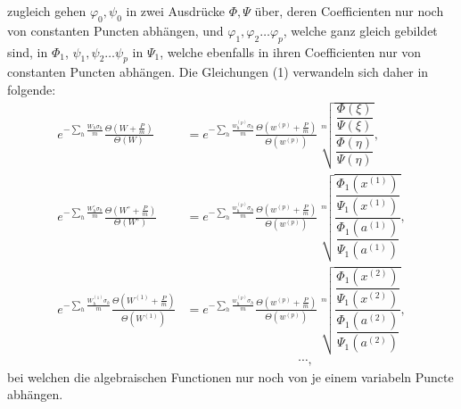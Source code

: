 \documentclass[10pt]{article}
\begin{document}
zugleich gehen \(\varphi_0,\psi_0\) in zwei Ausdrücke \(\Phi,\Psi\) über, deren Coefficienten nur noch von constanten Puncten abhängen, und \(\varphi_1,\varphi_2\ldots\varphi_p\), welche ganz gleich gebildet sind, in \(\Phi_1\), \(\psi_1,\psi_2\ldots\psi_p\) in \(\Psi_1\), welche ebenfalls in ihren Coefficienten nur von constanten Puncten abhängen. Die Gleichungen (1) verwandeln sich daher in folgende:
\[
\begin{aligned}
e^{-\sum_h\frac{W_h\sigma_h}{m}}
\frac{\Theta\left(W+\frac Pm\right)}{\Theta(W)}
&=
e^{-\sum_h\frac{w_h^{(p)}\sigma_h}{m}}
\frac{\Theta\left(w^{(p)}+\frac Pm\right)}{\Theta(w^{(p)})}
\sqrt[m]{\dfrac{\dfrac{\Phi(\xi)}{\Psi(\xi)}}{\dfrac{\Phi(\eta)}{\Psi(\eta)}}},\\
e^{-\sum_h\frac{W_h^\circ\sigma_h}{m}}
\frac{\Theta\left(W^\circ+\frac Pm\right)}{\Theta(W^\circ)}
&=
e^{-\sum_h\frac{w_h^{(p)}\sigma_h}{m}}
\frac{\Theta\left(w^{(p)}+\frac Pm\right)}{\Theta(w^{(p)})}
\sqrt[m]{\dfrac{\dfrac{\Phi_1(x^{(1)})}{\Psi_1(x^{(1)})}}{\dfrac{\Phi_1(a^{(1)})}{\Psi_1(a^{(1)})}}},\\
e^{-\sum_h\frac{W_h^{(1)}\sigma_h}{m}}
\frac{\Theta\left(W^{(1)}+\frac Pm\right)}{\Theta(W^{(1)})}
&=
e^{-\sum_h\frac{w_h^{(p)}\sigma_h}{m}}
\frac{\Theta\left(w^{(p)}+\frac Pm\right)}{\Theta(w^{(p)})}
\sqrt[m]{\dfrac{\dfrac{\Phi_1(x^{(2)})}{\Psi_1(x^{(2)})}}{\dfrac{\Phi_1(a^{(2)})}{\Psi_1(a^{(2)})}}},\\
&\hspace{9em}\cdots,
\end{aligned}
\]
bei welchen die algebraischen Functionen nur noch von je einem variabeln Puncte abhängen.
\end{document}
